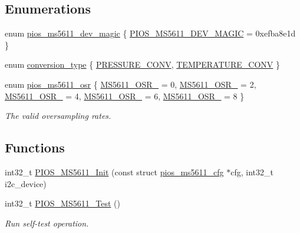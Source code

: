 \subsection*{\-Enumerations}
\begin{DoxyCompactItemize}
\item 
enum \hyperlink{group___p_i_o_s___m_s5611_ga3d4540192eb752517e6fc8aff70a97a8}{pios\-\_\-ms5611\-\_\-dev\-\_\-magic} \{ \hyperlink{group___p_i_o_s___m_s5611_gga3d4540192eb752517e6fc8aff70a97a8a27d4787a6d60788973baef12a43611e2}{\-P\-I\-O\-S\-\_\-\-M\-S5611\-\_\-\-D\-E\-V\-\_\-\-M\-A\-G\-I\-C} =  0xefba8e1d
 \}
\item 
enum \hyperlink{group___p_i_o_s___m_s5611_ga519b74aaa0203f0671cd8223b8db250a}{conversion\-\_\-type} \{ \hyperlink{group___p_i_o_s___m_s5611_gga519b74aaa0203f0671cd8223b8db250aa6bbea8dd296d93df2db36e840705af31}{\-P\-R\-E\-S\-S\-U\-R\-E\-\_\-\-C\-O\-N\-V}, 
\hyperlink{group___p_i_o_s___m_s5611_gga519b74aaa0203f0671cd8223b8db250aace547756a2c069fa9f1444ccd5e234f9}{\-T\-E\-M\-P\-E\-R\-A\-T\-U\-R\-E\-\_\-\-C\-O\-N\-V}
 \}
\item 
enum \hyperlink{group___p_i_o_s___m_s5611_gab2c6484befa4b5993218d392d4db0bd3}{pios\-\_\-ms5611\-\_\-osr} \{ \*
\hyperlink{group___p_i_o_s___m_s5611_ggab2c6484befa4b5993218d392d4db0bd3aeef4ce47c7f22cd8c666c900bcda67e5}{\-M\-S5611\-\_\-\-O\-S\-R\-\_} =  0, 
\hyperlink{group___p_i_o_s___m_s5611_ggab2c6484befa4b5993218d392d4db0bd3a60c8665f8353b3864ad3963a3728a45c}{\-M\-S5611\-\_\-\-O\-S\-R\-\_} =  2, 
\hyperlink{group___p_i_o_s___m_s5611_ggab2c6484befa4b5993218d392d4db0bd3a26d56baed9a0b84d0b05eb809f9a5596}{\-M\-S5611\-\_\-\-O\-S\-R\-\_} =  4, 
\hyperlink{group___p_i_o_s___m_s5611_ggab2c6484befa4b5993218d392d4db0bd3a443ca046dbc9a4b28f86c7197b9da9a7}{\-M\-S5611\-\_\-\-O\-S\-R\-\_} =  6, 
\*
\hyperlink{group___p_i_o_s___m_s5611_ggab2c6484befa4b5993218d392d4db0bd3a04b0d6cfe18bcce2c7ddc8fe21f7f6a2}{\-M\-S5611\-\_\-\-O\-S\-R\-\_} =  8
 \}
\begin{DoxyCompactList}\small\item\em \-The valid oversampling rates. \end{DoxyCompactList}\end{DoxyCompactItemize}
\subsection*{\-Functions}
\begin{DoxyCompactItemize}
\item 
int32\-\_\-t \hyperlink{group___p_i_o_s___m_s5611_ga31828cf8d806bc616c063b785165ede1}{\-P\-I\-O\-S\-\_\-\-M\-S5611\-\_\-\-Init} (const struct \hyperlink{structpios__ms5611__cfg}{pios\-\_\-ms5611\-\_\-cfg} $\ast$cfg, int32\-\_\-t i2c\-\_\-device)
\item 
int32\-\_\-t \hyperlink{group___p_i_o_s___m_s5611_ga46e5e2cff722dd4031da3bf1603afda2}{\-P\-I\-O\-S\-\_\-\-M\-S5611\-\_\-\-Test} ()
\begin{DoxyCompactList}\small\item\em \-Run self-\/test operation. \end{DoxyCompactList}\end{DoxyCompactItemize}


